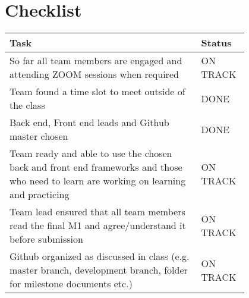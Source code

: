 \section{Checklist}

\begin{tabular}{ | p{0.8\linewidth} | l | }
\hline
Task																																	& Status\\\hline
So far all team members are engaged and attending ZOOM sessions when required															& ON TRACK	\\\hline
Team found a time slot to meet outside of the class																						& DONE	\\\hline
Back end, Front end leads and Github master chosen																						& DONE	\\\hline
Team ready and able to use the chosen back and front end frameworks and those who need to learn are working on learning and practicing 	& ON TRACK	\\\hline
Team lead ensured that all team members read the final M1 and agree/understand it before submission										& ON TRACK	\\\hline
Github organized as discussed in class (e.g. master branch, development branch, folder for milestone documents etc.)					& ON TRACK	\\\hline
\end{tabular}